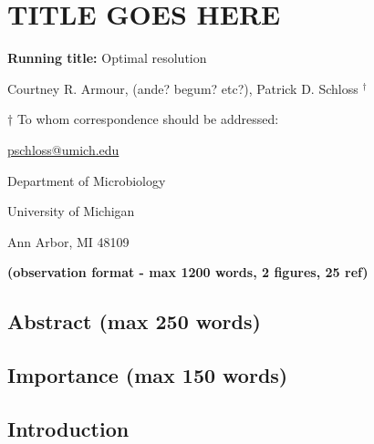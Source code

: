 \documentclass[
]{article}
\author{}
\date{\vspace{-2.5em}}
\begin{document}
\hypertarget{title-goes-here}{%
\section{TITLE GOES HERE}\label{title-goes-here}}

\vspace{20mm}

\textbf{Running title:} Optimal resolution

\vspace{10mm}

Courtney R. Armour, (ande? begum? etc?), Patrick D. Schloss
\({^\dagger}\)

\vspace{20mm}

\({\dagger}\) To whom correspondence should be addressed:

\href{mailto:pschloss@umich.edu}{pschloss@umich.edu}

Department of Microbiology

University of Michigan

Ann Arbor, MI 48109

\vspace{20mm}

\textbf{(observation format - max 1200 words, 2 figures, 25 ref)}

\newpage

\hypertarget{abstract-max-250-words}{%
\subsection{Abstract (max 250 words)}\label{abstract-max-250-words}}

\hypertarget{importance-max-150-words}{%
\subsection{Importance (max 150 words)}\label{importance-max-150-words}}

\newpage

\hypertarget{introduction}{%
\subsection{Introduction}\label{introduction}}
\end{document}
